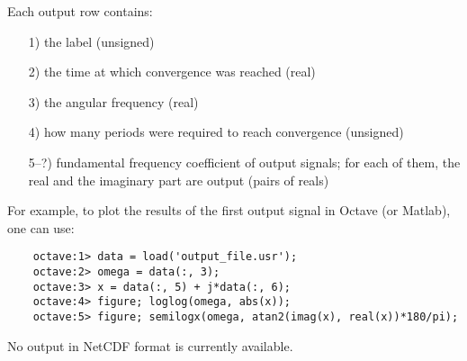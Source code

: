 Each output row contains:
\begin{itemize}
\item[1)] the label (unsigned)
\item[2)] the time at which convergence was reached (real)
\item[3)] the angular frequency (real)
\item[4)] how many periods were required to reach convergence (unsigned)
\item[5--?)] fundamental frequency coefficient of output signals; for each of them, the real and the imaginary part are output (pairs of reals)
\end{itemize}
For example, to plot the results of the first output signal in Octave (or Matlab), one can use:
\begin{framed}
\begin{verbatim}
    octave:1> data = load('output_file.usr');
    octave:2> omega = data(:, 3);
    octave:3> x = data(:, 5) + j*data(:, 6);
    octave:4> figure; loglog(omega, abs(x));
    octave:5> figure; semilogx(omega, atan2(imag(x), real(x))*180/pi);
\end{verbatim}
\end{framed}


No output in NetCDF format is currently available.


